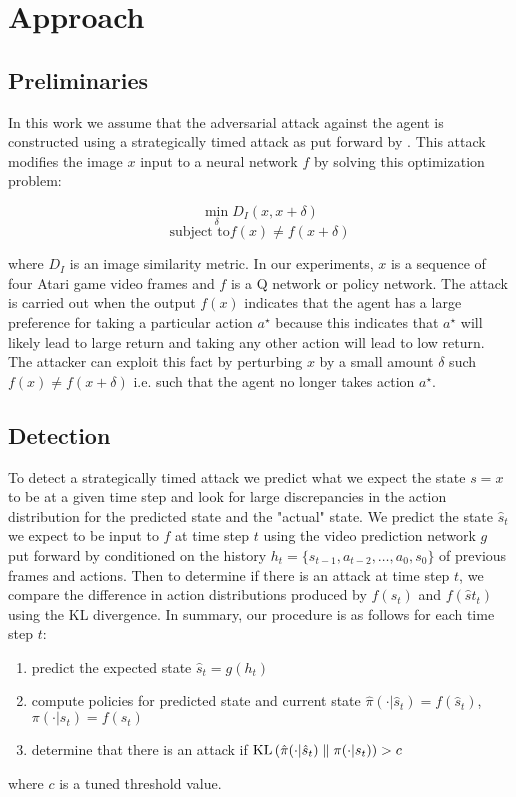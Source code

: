 \section{Approach}

\subsection{Preliminaries}
In this work we assume that the adversarial attack against the agent
is constructed using a strategically timed attack as put forward by
\cite{nine}. This attack modifies the image $x$ input to a neural network
$f$ by solving this optimization problem:

$$\min_{\delta}{D_I(x, x + \delta)}$$
$$\mbox{subject to} f(x) \neq f(x + \delta)$$

where $D_I$ is an image similarity metric.
In our experiments, $x$ is a sequence of four Atari game video frames
and $f$ is a Q network or policy network. The attack is carried out when
the output $f(x)$ indicates that the agent has a large preference for
taking a particular action $a^\star$ because this indicates that $a^\star$
will likely lead to large return and taking any other action will lead to
low return. The attacker can exploit this fact by perturbing $x$ by a small
amount $\delta$ such $f(x) \neq f(x + \delta)$ i.e. such that the agent no longer
takes action $a^\star$.

\subsection{Detection}
To detect a strategically timed attack we predict what we expect the state $s = x$
to be at a given time step and look for large discrepancies in the
action distribution for the predicted state and the "actual" state.
We predict the state $\hat s_t$ we expect to be input to $f$ at time step $t$
using the video prediction network $g$ put forward by \cite{fourteen}
conditioned on the history $h_t = \{s_{t-1}, a_{t-2}, \dots, a_0, s_0\}$ of
previous frames and actions. Then to determine if there is an attack
at time step $t$, we compare the difference in action distributions
produced by $f(s_t)$ and $f(\hat st_t)$ using the \textrm{KL} divergence.
In summary, our procedure is as follows for each time step $t$:
\begin{enumerate}
    \item predict the expected state $\hat s_t = g(h_t)$
    \item compute policies for predicted state and current state $\hat \pi( \cdot \vert \hat s_t) = f(\hat s_t)$, $\pi( \cdot \vert s_t) = f(s_t)$
    \item determine that there is an attack if $\textrm{KL}\left(\hat \pi( \cdot \vert \hat s_t)\;\|\;\pi( \cdot \vert s_t)\right) > c$
\end{enumerate}
where $c$ is a tuned threshold value. 
\\

